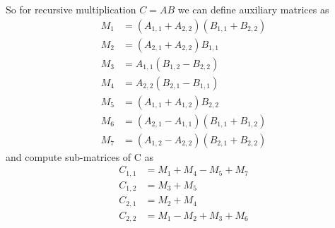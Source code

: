 \documentclass[a4paper,11pt]{article}
\begin{document}
So for recursive multiplication $C=AB$ we can define auxiliary matrices as 
\begin{align*}
M_{1} &= (A_{1,1} + A_{2,2})(B_{1,1} + B_{2,2}) \\
M_{2} &= (A_{2,1} + A_{2,2})B_{1,1} \\
M_{3} &= A_{1,1}(B_{1,2} - B_{2,2}) \\
M_{4} &= A_{2,2}(B_{2,1} - B_{1,1}) \\
M_{5} &= (A_{1,1} + A_{1,2})B_{2,2} \\
M_{6} &= (A_{2,1} - A_{1,1})(B_{1,1} + B_{1,2}) \\
M_{7} &= (A_{1,2} - A_{2,2})(B_{2,1} + B_{2,2})
\end{align*}
and compute sub-matrices of C as
\begin{align*}
C_{1,1} &= M_{1} + M_{4} - M_{5} + M_{7} \\
C_{1,2} &= M_{3} + M_{5} \\
C_{2,1} &= M_{2} + M_{4} \\
C_{2,2} &= M_{1} - M_{2} + M_{3} + M_{6}
\end{align*}
\end{document}
